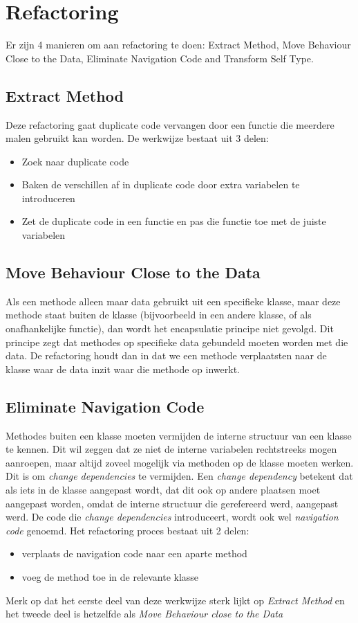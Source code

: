 \documentclass{article}
\begin{document}
\section{Refactoring}
Er zijn 4 manieren om aan refactoring te doen: Extract Method, Move Behaviour Close to the Data, Eliminate Navigation Code and Transform Self Type.

\subsection{Extract Method}
Deze refactoring gaat duplicate code vervangen door een functie die meerdere malen gebruikt kan worden. De werkwijze bestaat uit 3 delen:
\begin{itemize}
\item Zoek naar duplicate code
\item Baken de verschillen af in duplicate code door extra variabelen te introduceren
\item Zet de duplicate code in een functie en pas die functie toe met de juiste variabelen
\end{itemize}

\subsection{Move Behaviour Close to the Data}
Als een methode alleen maar data gebruikt uit een specifieke klasse, maar deze methode staat buiten de klasse (bijvoorbeeld in een andere klasse, of als onafhankelijke functie), dan wordt het encapsulatie principe niet gevolgd. Dit principe zegt dat methodes op specifieke data gebundeld moeten worden met die data. De refactoring houdt dan in dat we een methode verplaatsten naar de klasse waar de data inzit waar die methode op inwerkt.

\subsection{Eliminate Navigation Code}
Methodes buiten een klasse moeten vermijden de interne structuur van een klasse te kennen. Dit wil zeggen dat ze niet de interne variabelen rechtstreeks mogen aanroepen, maar altijd zoveel mogelijk via methoden op de klasse moeten werken. Dit is om \textit{change dependencies} te vermijden. Een \textit{change dependency} betekent dat als iets in de klasse aangepast wordt, dat dit ook op andere plaatsen moet aangepast worden, omdat de interne structuur die gerefereerd werd, aangepast werd. De code die \textit{change dependencies} introduceert, wordt ook wel \textit{navigation code} genoemd. Het refactoring proces bestaat uit 2 delen:
\begin{itemize}
\item verplaats de navigation code naar een aparte method
\item voeg de method toe in de relevante klasse
\end{itemize}
Merk op dat het eerste deel van deze werkwijze sterk lijkt op \textit{Extract Method} en het tweede deel is hetzelfde als \textit{Move Behaviour close to the Data}
\end{document}
